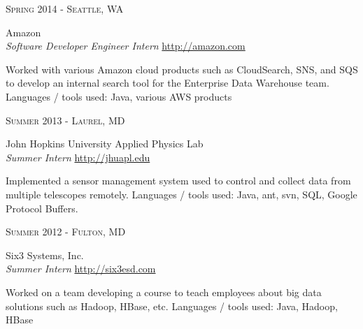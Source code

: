 \documentclass[10pt]{article} %
\begin{document}
{\begin{minipage}[t]{0.5\textwidth}

{\raggedleft\textsc{Spring 2014 - Seattle, WA}\par}

{\raggedright\large Amazon \\
\textit{Software Developer Engineer Intern}  \hfill {\small \href{http://amazon.com}{http://amazon.com}}\\ [5pt]}

\normalsize{Worked with various Amazon cloud products such as CloudSearch, SNS, 
and SQS to develop an internal search tool for the Enterprise Data Warehouse 
team. Languages / tools used: Java, various AWS products}\\


{\raggedleft\textsc{Summer 2013 - Laurel, MD}\par}

{\raggedright\large John Hopkins University Applied Physics Lab \\
\textit{Summer Intern}  \hfill {\small \href{http://jhuapl.edu}{http://jhuapl.edu}}\\ [5pt]}

\normalsize{Implemented a sensor management system used to control and collect 
data from multiple telescopes remotely. Languages / tools used: Java, ant, 
svn, SQL, Google Protocol Buffers.}\\


{\raggedleft\textsc{Summer 2012 - Fulton, MD}\par}

{\raggedright\large Six3 Systems, Inc. \\
\textit{Summer Intern} \hfill {\small \href{http://six3esd.com}{http://six3esd.com}} \\[5pt]}

\normalsize{Worked on a team developing a course to teach employees about big 
data solutions such as Hadoop, HBase, etc. Languages / tools used: Java, 
Hadoop, HBase}\\



\end{minipage}}
\end{document}
